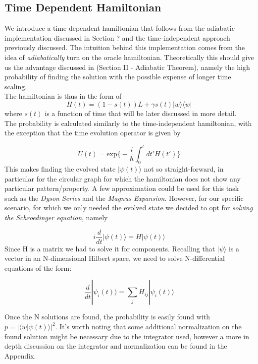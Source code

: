 \documentclass[aps,pra,reprint, onecolumn]{revtex4-2}
\begin{document}
\subsection{Time Dependent Hamiltonian}
We introduce a time dependent hamiltonian that follows from the adiabatic implementation discussed in Section ? and the time-independent approach previously discussed. The intuition behind this implementation comes from the idea of \textit{adiabatically} turn on the oracle hamiltonian. Theoretically this should give us the advantage discussed in (Section II - Adiabatic Theorem), namely the high probability of finding the solution with the possible expense of longer time scaling. \\
The hamiltonian is thus in the form of
\begin{equation}
H(t) = (1-s(t))L + \gamma s(t)|w\rangle\langle w|
\end{equation}
where $s(t)$ is a function of time that will be later discussed in more detail. \\

The probability is calculated similarly to the time-independent hamiltonian, with the exception that the time evolution operator is given by

\begin{equation}
U(t) = \mbox{exp} \Big\{ -\frac{i}{\hbar} \int_{0}^{t}dt'H(t') \Big\}
\end{equation}
This makes finding the evolved state $|\psi(t)\rangle$ not so straight-forward, in particular for the circular graph for which the hamiltonian does not show any particular pattern/property. A few approximation could be used for this task such as the \textit{Dyson Series} and the \textit{Magnus Expansion}. However, for our specific scenario, for which we only needed the evolved state we decided to opt for \textit{solving the Schroedinger equation}, namely

\begin{equation}
  i\frac{d}{dt}|\psi(t)\rangle = H |\psi(t)\rangle
\end{equation}
Since H is a matrix we had to solve it for components. Recalling that $|\psi\rangle$ is a vector in an N-dimensional Hilbert space, we need to solve N-differential equations of the form:

\begin{equation}
\frac{d}{dt}|\psi_i(t)\rangle = \sum_jH_{ij}|\psi_i(t)\rangle
\end{equation}

Once the N solutions are found, the probability is easily found with $p=|\langle w |\psi(t)\rangle|^2$. It's worth noting that some additional normalization on the found solution might be necessary due to the integrator used, however a more in depth discussion on the integrator and normalization can be found in the Appendix.
\end{document}
